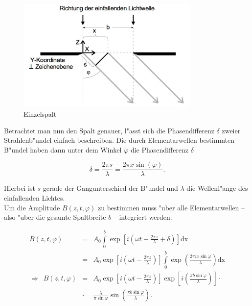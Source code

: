 		\begin{figure}[h]
				\centering
				\includegraphics[width = 9cm]{spalt.jpg}
				\caption{Einzelspalt \cite{anleitung}}
				\label{abb_spalt}
		\end{figure}

		Betrachtet man nun den Spalt genauer, l"asst sich die Phasendifferenz $\delta$ zweier Strah\-len\-b"un\-del einfach beschreiben. Die durch Elementarwellen bestimmten B"undel haben dann unter dem Winkel $\varphi$ die Phasendifferenz $\delta$

		\begin{equation}
			\delta = \frac{2 \pi s}{\lambda} = \frac{2 \pi x \sin(\varphi)}{\lambda} .
		\end{equation}

		Hierbei ist $s$ gerade der Gangunterschied der B"undel und $\lambda$ die Wellenl"ange des ein\-fal\-len\-den Lichtes.\\
		Um die Amplitude $B(z, t, \varphi)$ zu bestimmen muss "uber alle Elementarwellen -- also "uber die gesamte Spaltbreite $b$ -- integriert werden:

		\begin{eqnarray}
			B(z, t, \varphi) &=& A_0 \int \limits_0^b \exp{\left[i \left(\omega t - \frac{2 \pi z}{\lambda} + \delta \right)\right]} \mathrm{dx} \nonumber \\
			&=& A_0 \exp{\left[i \left(\omega t - \frac{2 \pi z}{\lambda}\right)\right]} \int \limits_0^b \exp{\left(\frac{2 \pi i x \sin{\varphi}}{\lambda}\right)} \mathrm{dx} \nonumber\\
			\Rightarrow \enspace
			B(z, t, \varphi) &=& A_0 \exp{\left[ i \left( \omega t - \frac{2\pi z}{\lambda}
			\right) \right] } 
			\exp{\left[i \left( \frac{\pi b \sin{\varphi}}{\lambda} \right)\right]}  \cdot \nonumber \\
			&\cdot& \frac{\lambda}{\pi \sin{\varphi}}
			\sin{\left( \frac{\pi b \sin{\varphi}}{\lambda} \right)}
			.
			\label{eqn:allgemeine_lsg}
		\end{eqnarray}

